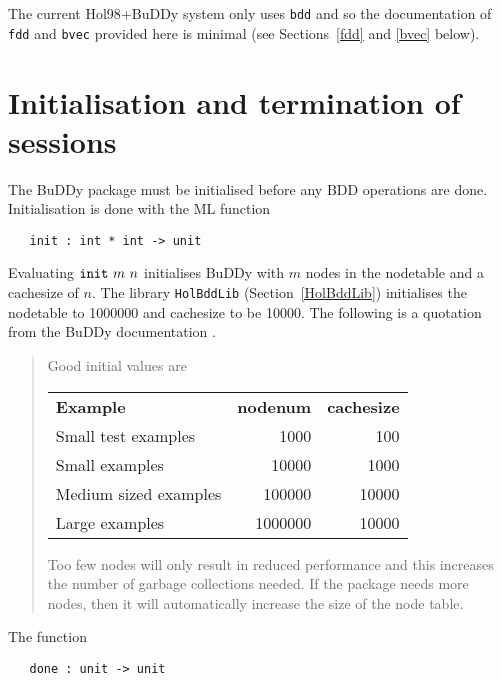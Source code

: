 \documentclass[12pt]{article}
\newcommand{\bnind}[1]{\index[MLbn]{#1}}
\renewcommand{\t}[1]{\mbox{\tt #1}}
\newcommand{\ty}[1]{\mbox{\tt #1}}
\newcommand{\ml}[1]{{\tt #1}}
\newcommand{\Buddy}{BuDDy\xspace}
\newcommand\HolBuddy{{Hol98{+}\Buddy\xspace}}
\newcommand\fun{\mbox{\tt{->}}}
\begin{document}
The current \HolBuddy{} system only uses \t{bdd} and so
the documentation of \t{fdd} and \t{bvec} provided here is minimal
(see Sections~\ref{fdd} and \ref{bvec} below).

\section{Initialisation and termination of sessions}\label{init}

The \Buddy{} package must be initialised before any BDD operations are done.
Initialisation is done with the ML function


%
%

\begin{verbatim}
   init : int * int -> unit
\end{verbatim}\bnind{\ml{init}}

Evaluating $\t{init}~m~n$ initialises \Buddy{} with $m$ nodes in the
nodetable and a cachesize of $n$.  
The library \t{HolBddLib} (Section~\ref{HolBddLib}) 
initialises the nodetable to 1000000 and cachesize to
be 10000. The following is a quotation from the \Buddy{} documentation \cite{BuDDy}.

\begin{quote}
Good initial values are

\medskip

\begin{tabular}{lrr}
{\bf Example} & {\bf nodenum} & {\bf cachesize} \\
Small test examples   & 1000    & 100\\
Small examples        & 10000   & 1000 \\
Medium sized examples & 100000  & 10000\\
Large examples        & 1000000 & 10000
\end{tabular}

\medskip

Too few nodes will only result in reduced performance and this
increases the number of garbage collections needed. If the package
needs more nodes, then it will automatically increase the size of the
node table.
\end{quote}

The function


\begin{verbatim}
   done : unit -> unit
\end{verbatim}\bnind{\ml{done}}
\end{document}
